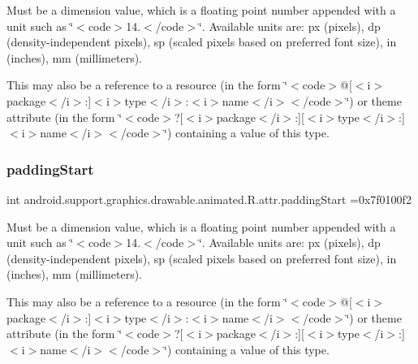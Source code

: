 Must be a dimension value, which is a floating point number appended with a unit such as \char`\"{}$<$code$>$14.\+5sp$<$/code$>$\char`\"{}. Available units are\+: px (pixels), dp (density-\/independent pixels), sp (scaled pixels based on preferred font size), in (inches), mm (millimeters). 

This may also be a reference to a resource (in the form \char`\"{}$<$code$>$@\mbox{[}$<$i$>$package$<$/i$>$\+:\mbox{]}$<$i$>$type$<$/i$>$\+:$<$i$>$name$<$/i$>$$<$/code$>$\char`\"{}) or theme attribute (in the form \char`\"{}$<$code$>$?\mbox{[}$<$i$>$package$<$/i$>$\+:\mbox{]}\mbox{[}$<$i$>$type$<$/i$>$\+:\mbox{]}$<$i$>$name$<$/i$>$$<$/code$>$\char`\"{}) containing a value of this type. \mbox{\label{classandroid_1_1support_1_1graphics_1_1drawable_1_1animated_1_1R_1_1attr_abd748e5a2c62055fe2bfc6c666a4cb3b}} 
\subsubsection{\texorpdfstring{padding\+Start}{paddingStart}}
{\footnotesize\ttfamily int android.\+support.\+graphics.\+drawable.\+animated.\+R.\+attr.\+padding\+Start =0x7f0100f2\hspace{0.3cm}{\ttfamily [static]}}

Must be a dimension value, which is a floating point number appended with a unit such as \char`\"{}$<$code$>$14.\+5sp$<$/code$>$\char`\"{}. Available units are\+: px (pixels), dp (density-\/independent pixels), sp (scaled pixels based on preferred font size), in (inches), mm (millimeters). 

This may also be a reference to a resource (in the form \char`\"{}$<$code$>$@\mbox{[}$<$i$>$package$<$/i$>$\+:\mbox{]}$<$i$>$type$<$/i$>$\+:$<$i$>$name$<$/i$>$$<$/code$>$\char`\"{}) or theme attribute (in the form \char`\"{}$<$code$>$?\mbox{[}$<$i$>$package$<$/i$>$\+:\mbox{]}\mbox{[}$<$i$>$type$<$/i$>$\+:\mbox{]}$<$i$>$name$<$/i$>$$<$/code$>$\char`\"{}) containing a value of this type. \mbox{\label{classandroid_1_1support_1_1graphics_1_1drawable_1_1animated_1_1R_1_1attr_aa1113b6d76fd1d7150bf442abb6a449f}} 
